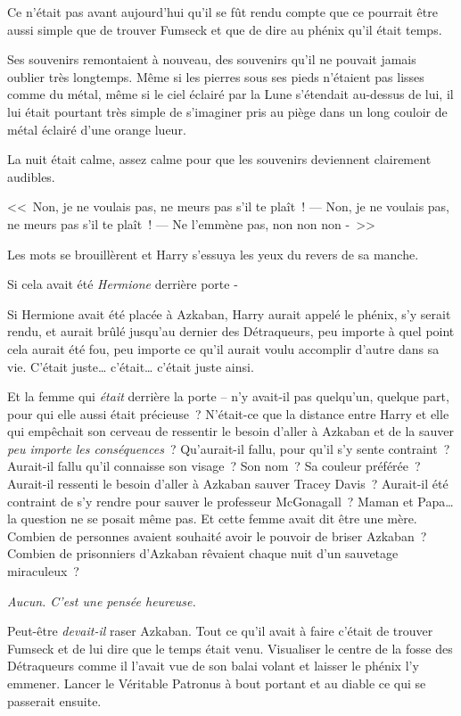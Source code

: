 Ce n'était pas avant aujourd'hui qu'il se fût rendu compte que ce pourrait être aussi simple que de trouver Fumseck et que de dire au phénix qu'il était temps.

Ses souvenirs remontaient à nouveau, des souvenirs qu'il ne pouvait jamais oublier très longtemps. Même si les pierres sous ses pieds n'étaient pas lisses comme du métal, même si le ciel éclairé par la Lune s'étendait au-dessus de lui, il lui était pourtant très simple de s'imaginer pris au piège dans un long couloir de métal éclairé d'une orange lueur.

La nuit était calme, assez calme pour que les souvenirs deviennent clairement audibles.

<<~Non, je ne voulais pas, ne meurs pas s'il te plaît~!
---  Non, je ne voulais pas, ne meurs pas s'il te plaît~!
---  Ne l'emmène pas, non non non -~>>

Les mots se brouillèrent et Harry s'essuya les yeux du revers de sa manche.

Si cela avait été \emph{Hermione} derrière porte -

Si Hermione avait été placée à Azkaban, Harry aurait appelé le phénix, s'y serait rendu, et aurait brûlé jusqu'au dernier des Détraqueurs, peu importe à quel point cela aurait été fou, peu importe ce qu'il aurait voulu accomplir d'autre dans sa vie. C'était juste… c'était… c'était juste ainsi.

Et la femme qui \emph{était} derrière la porte -- n'y avait-il pas quelqu'un, quelque part, pour qui elle aussi était précieuse~? N'était-ce que la distance entre Harry et elle qui empêchait son cerveau de ressentir le besoin d'aller à Azkaban et de la sauver \emph{peu importe les conséquences}~? Qu'aurait-il fallu, pour qu'il s'y sente contraint~? Aurait-il fallu qu'il connaisse son visage~? Son nom~? Sa couleur préférée~? Aurait-il ressenti le besoin d'aller à Azkaban sauver Tracey Davis~? Aurait-il été contraint de s'y rendre pour sauver le professeur McGonagall~? Maman et Papa… la question ne se posait même pas. Et cette femme avait dit être une mère. Combien de personnes avaient souhaité avoir le pouvoir de briser Azkaban~? Combien de prisonniers d'Azkaban rêvaient chaque nuit d'un sauvetage miraculeux~?

\emph{Aucun. C'est une pensée heureuse.}

Peut-être \emph{devait-il} raser Azkaban. Tout ce qu'il avait à faire c'était de trouver Fumseck et de lui dire que le temps était venu. Visualiser le centre de la fosse des Détraqueurs comme il l'avait vue de son balai volant et laisser le phénix l'y emmener. Lancer le Véritable Patronus à bout portant et au diable ce qui se passerait ensuite.

